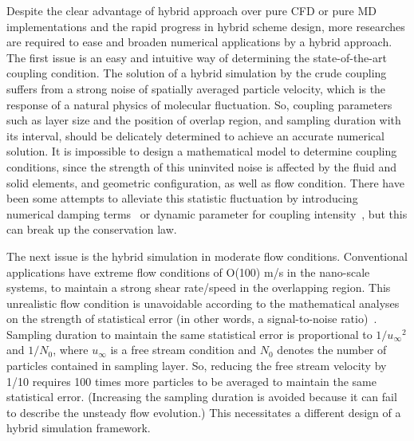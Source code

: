 \documentclass[preprint,12pt]{elsarticle}
\begin{document}
Despite the clear advantage of hybrid approach over pure CFD or pure MD implementations and the rapid progress in hybrid scheme design, more researches are required to ease and broaden numerical applications by a hybrid approach. The first issue is an easy and intuitive way of determining the state-of-the-art coupling condition. The solution of a hybrid simulation by the crude coupling suffers from a strong noise of spatially averaged particle velocity, which is the response of a natural physics of molecular fluctuation. So, coupling parameters such as layer size and the position of overlap region, and sampling duration with its interval, should be delicately determined to achieve an accurate numerical solution. It is impossible to design a mathematical model to determine coupling conditions, since the strength of this uninvited noise is affected by the fluid and solid elements, and geometric configuration, as well as flow condition. There have been some attempts to alleviate this statistic fluctuation by introducing numerical damping terms~\cite{Thompson,Cui} or dynamic parameter for coupling intensity~\cite{Wang}, but this can break up the conservation law.

The next issue is the hybrid simulation in moderate flow conditions. Conventional applications have extreme flow conditions of O(100) m/s in the nano-scale systems, to maintain a strong shear rate/speed in the overlapping region.
This unrealistic flow condition is unavoidable according to the mathematical analyses on the strength of statistical error (in other words, a signal-to-noise ratio)~\cite{Hadjicon3,Time_Mechanism}. Sampling duration to maintain the same statistical error is proportional to ${{1} / {{u}_{\infty}}^2}$ and ${{1} / {N_0}}$, where ${u_{\infty}}$ is a free stream condition and ${N_0}$ denotes the number of particles contained in sampling layer.
So, reducing the free stream velocity by 1/10 requires 100 times more particles to be averaged to maintain the same statistical error. (Increasing the sampling duration is avoided because it can fail to describe the unsteady flow evolution.) This necessitates a different design of a hybrid simulation framework.
\end{document}
